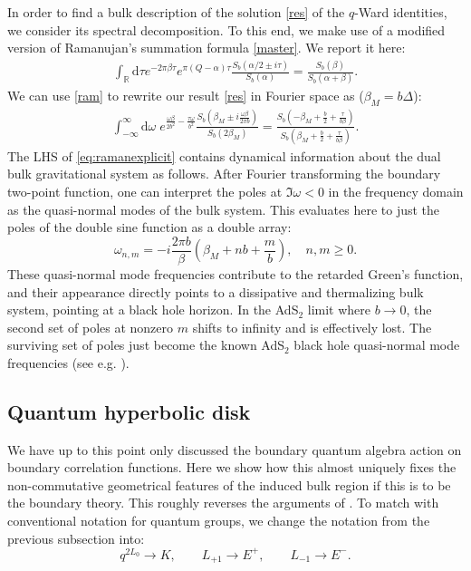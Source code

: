 \documentclass[a4paper,titlepage,12pt]{article}
\numberwithin{equation}{section}
\begin{document}
In order to find a bulk description of the solution \eqref{res} of the $q$-Ward identities, we consider its spectral decomposition. To this end, we make use of a modified version of Ramanujan's summation formula \eqref{master}. We report it here:
\begin{align}
\label{ram}
\int_\mathbb{R} \mathrm{d}\tau e^{-2\pi \beta \tau} e^{\pi (Q-\alpha)\tau} \frac{S_b(\alpha/2 \pm i \tau)}{S_b(\alpha)}= \frac{S_b(\beta)}{S_b(\alpha+\beta)}.
\end{align}
We can use \eqref{ram} to rewrite our result \eqref{res} in Fourier space as ($\beta_M=b \Delta$):
\begin{align}
\label{eq:ramanexplicit}
    \int_{-\infty}^{\infty}\mathrm{d}\omega\; e^{\frac{\omega \beta}{2b^2}-\frac{\tau\omega}{b^2}}\frac{S_b\left(\beta_M\pm i \frac{\omega\beta}{2\pi b}\right)}{S_b(2\beta_M)}= \frac{S_b(-\beta_M+\frac{b}{2}+\frac{\tau}{b\beta})}{S_b(\beta_M+\frac{b}{2}+\frac{\tau}{b\beta})}.
\end{align}
The LHS of \eqref{eq:ramanexplicit} contains dynamical information about the dual bulk gravitational system as follows. After Fourier transforming the boundary two-point function, one can interpret the poles at $\Im \omega < 0$ in the frequency domain as the quasi-normal modes of the bulk system. This evaluates here to just the poles of the double sine function as a double array:
\begin{equation}
\label{qnm}
\omega_{n,m} = -i \frac{2\pi b}{\beta}\left(\beta_M+nb+\frac{m}{b}\right), \quad n,m \geq 0.
\end{equation}
These quasi-normal mode frequencies contribute to the retarded Green's function, and their appearance directly points to a dissipative and thermalizing bulk system, pointing at a black hole horizon. In the AdS$_2$ limit where $b\to 0$, the second set of poles at nonzero $m$ shifts to infinity and is effectively lost. The surviving set of poles just become the known AdS$_2$ black hole quasi-normal mode frequencies (see e.g. \cite{Keeler:2014hba}).

\subsection{Quantum hyperbolic disk}
We have up to this point only discussed the boundary quantum algebra action on boundary correlation functions. Here we show how this almost uniquely fixes the non-commutative geometrical features of the induced bulk region if this is to be the boundary theory. This roughly reverses the arguments of \cite{Berkooz:2022mfk,Almheiri:2024ayc}. To match with conventional notation for quantum groups, we change the notation from the previous subsection into:
\begin{equation}
q^{2L_0} \to K, \qquad  L_{+1} \to E^+, \qquad  L_{-1} \to E^-.
\end{equation}
\end{document}
